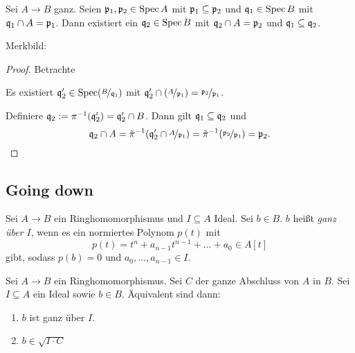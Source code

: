 \documentclass[12pt,a4paper]{scrartcl}
\theoremstyle{cplain}
\theoremstyle{cdef}
\begin{document}
\begin{satz}[Going up] \label{thm:going up}
	Sei $A\to B$ ganz. Seien $\mathfrak{p}_1,\mathfrak{p}_2\in \operatorname{Spec} A$ mit $\mathfrak{p}_1\subseteq \mathfrak{p}_2$ und $\mathfrak{q}_1\in \operatorname{Spec} B$ mit $\mathfrak{q}_1\cap A = \mathfrak{p}_1$. Dann existiert ein $\mathfrak{q}_2\in \operatorname{Spec} B$ mit $\mathfrak{q}_2\cap A = \mathfrak{p}_2$ und $\mathfrak{q}_1\subseteq \mathfrak{q}_2$.

	Merkbild:
	\begin{center}
	\end{center}
\end{satz}
\begin{proof}
	Betrachte \begin{center}
	\end{center}
	Es existiert $\mathfrak{q}_2'\in\operatorname{Spec} (\nicefrac{B}{\mathfrak{q}_1})$ mit $\mathfrak{q}_2'\cap(\nicefrac{A}{\mathfrak{p}_1}) = \nicefrac{\mathfrak{p}_2}{\mathfrak{p}_1}$.
	
	Definiere $\mathfrak{q}_2 := \pi^{-1}(\mathfrak{q}_2') = \mathfrak{q}_2'\cap B$. Dann gilt $\mathfrak{q}_1\subseteq \mathfrak{q}_2$ und
	\[\mathfrak{q}_2\cap A = \tilde{\pi}^{-1}(\mathfrak{q}_2'\cap \nicefrac{A}{\mathfrak{p}_1}) = \tilde{\pi}^{-1}(\nicefrac{\mathfrak{p}_2}{\mathfrak{p}_1}) = \mathfrak{p}_2.\qedhere\]
\end{proof}

\subsection{Going down}
\begin{defi}
	Sei $A\to B$ ein Ringhomomorphismus und $I\subseteq A$ Ideal. Sei $b\in B$. $b$ heißt \emph{ganz über $I$}, wenn es ein normiertes Polynom $p(t)$ mit
	$$p(t) = t^n+a_{n-1}t^{n-1}+\dots + a_0\in A[t]$$
	gibt, sodass $p(b) = 0$ und $a_0,\dots, a_{n-1}\in I$.
\end{defi}
\begin{lem} \label{lem:6.11}
	Sei $A\to B$ ein Ringhomomorphismus. Sei $C$ der ganze Abschluss von $A$ in $B$. Sei $I\subseteq A$ ein Ideal sowie $b\in B$. Äquivalent sind dann:
	\begin{enumerate}
		\item $b$ ist ganz über $I$. \label{lem:6.11:i}
		\item $b\in \sqrt{I\cdot C}$ \label{lem:6.11:ii}
	\end{enumerate}
\end{lem}
\end{document}
